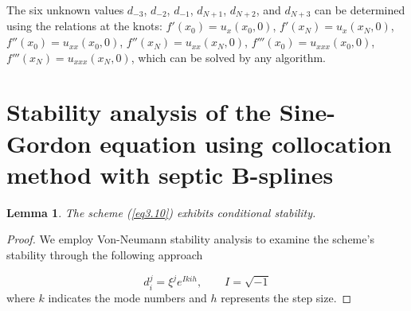 \documentclass[10pt,letterpaper,twoside]{article}
\newtheorem{lemma}[theorem]{Lemma}
\begin{document}
The six unknown values $d_{-3}$, $d_{-2}$, $d_{-1}$, $d_{N+1}$, $d_{N+2}$, and $d_{N+3}$ can be determined using the relations at the knots: $f'(x_0) = u_x(x_0,0)$, $f'(x_N) = u_x(x_N,0)$, $f''(x_0) = u_{xx}(x_0,0)$, $f''(x_N) = u_{xx}(x_N,0)$, $f'''(x_0) = u_{xxx}(x_0,0)$, $f'''(x_N) = u_{xxx}(x_N,0)$, which can be solved by any algorithm.

\section{Stability analysis of the Sine-Gordon equation using collocation method with septic B-splines}
\begin{lemma}
 The scheme (\ref{eq3.10}) exhibits conditional stability.
\end{lemma}
\begin{proof}
 We employ Von-Neumann stability analysis to examine the scheme's stability through the following approach
 
 \begin{equation}
  d_{i}^{j}=\xi ^{j}e^{Ikih},\quad \quad I=\sqrt{-1}  \label{p4.115}
 \end{equation}
\bigskip where $k$ indicates the mode numbers and $h$ represents the step size.


\end{proof}
\end{document}
